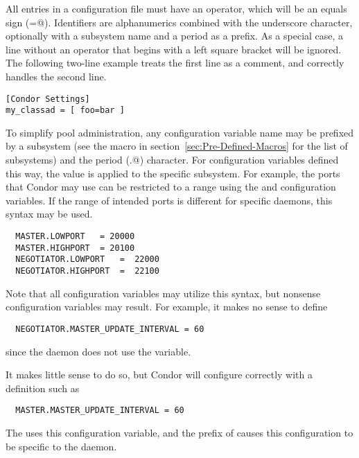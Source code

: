 
All entries in a configuration file must have an operator,
which will be an equals sign (\verb@=@).
Identifiers are alphanumerics combined with the underscore character,
optionally with a subsystem name and a period as a prefix.
As a special case,
a line without an operator that begins with a left square bracket
will be ignored.
The following two-line example treats the first line as a comment,
and correctly handles the second line.
\begin{verbatim}
[Condor Settings]
my_classad = [ foo=bar ]
\end{verbatim}

To simplify pool administration,
any configuration variable name may be prefixed by
a subsystem 
(see the  macro in 
section~\ref{sec:Pre-Defined-Macros}
for the list of subsystems)
and the period (\verb@.@) character.
For configuration variables defined this way,
the value is applied to the specific subsystem.
For example,
the ports that Condor may use can be restricted to a range 
using the  and  configuration
variables.
If the range of intended ports is different for specific
daemons, this syntax may be used.
\begin{verbatim}
  MASTER.LOWPORT   = 20000
  MASTER.HIGHPORT  = 20100
  NEGOTIATOR.LOWPORT   =  22000 
  NEGOTIATOR.HIGHPORT  =  22100
\end{verbatim}

Note that all configuration variables may utilize this syntax,
but nonsense configuration variables may result.
For example, it makes no sense to define
\begin{verbatim}
  NEGOTIATOR.MASTER_UPDATE_INTERVAL = 60
\end{verbatim}
since the  daemon does not use the
 variable.

It makes little sense to do so, but Condor will configure
correctly with a definition such as
\begin{verbatim}
  MASTER.MASTER_UPDATE_INTERVAL = 60
\end{verbatim}
The  uses this configuration variable,
and the prefix of  causes this configuration
to be specific to the  daemon.


